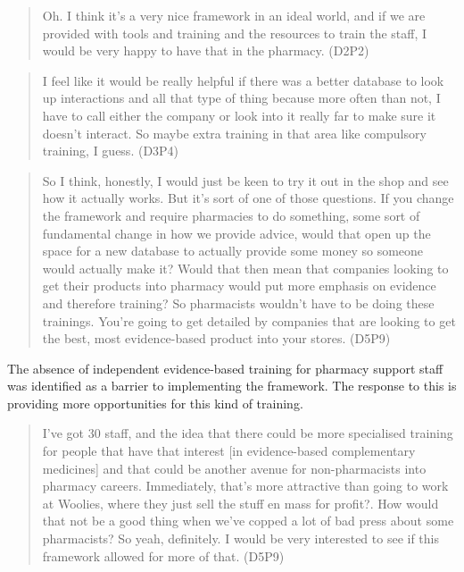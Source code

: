 \documentclass[11pt,a4paper]{article}
\begin{document}
\begin{quote}
Oh. I think it's a very nice framework in an ideal world, and if we are
provided with tools and training and the resources to train the staff, I
would be very happy to have that in the pharmacy. (D2P2)
\end{quote}

\begin{quote}
I feel like it would be really helpful if there was a better database to
look up interactions and all that type of thing because more often than
not, I have to call either the company or look into it really far to
make sure it doesn't interact. So maybe extra training in that area like
compulsory training, I guess. (D3P4)
\end{quote}

\begin{quote}
So I think, honestly, I would just be keen to try it out in the shop and
see how it actually works. But it's sort of one of those questions. If
you change the framework and require pharmacies to do something, some
sort of fundamental change in how we provide advice, would that open up
the space for a new database to actually provide some money so someone
would actually make it? Would that then mean that companies looking to
get their products into pharmacy would put more emphasis on evidence and
therefore training? So pharmacists wouldn't have to be doing these
trainings. You're going to get detailed by companies that are looking to
get the best, most evidence-based product into your stores. (D5P9)
\end{quote}

The absence of independent evidence-based training for pharmacy support
staff was identified as a barrier to implementing the framework. The
response to this is providing more opportunities for this kind of
training.

\begin{quote}
I've got 30 staff, and the idea that there could be more specialised
training for people that have that interest {[}in evidence-based
complementary medicines{]} and that could be another avenue for
non-pharmacists into pharmacy careers. Immediately, that's more
attractive than going to work at Woolies, where they just sell the stuff
en mass for profit?. How would that not be a good thing when we've
copped a lot of bad press about some pharmacists? So yeah, definitely. I
would be very interested to see if this framework allowed for more of
that. (D5P9)
\end{quote}
\end{document}
